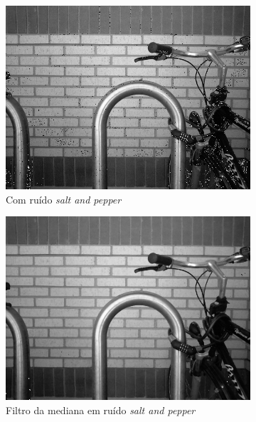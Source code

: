 \documentclass[10pt,a4paper]{article}
\begin{document}
\begin{figure}[!ht]
    \centering
    \begin{subfigure}[ht]{0.45\textwidth}
        \includegraphics[width=\textwidth]{sp.jpg}
        \caption{Com ruído \textit{salt and pepper}}
    \end{subfigure}
    \qquad
    \begin{subfigure}[ht]{0.45\textwidth}
        \includegraphics[width=\textwidth]{sp_median.jpg}
        \caption{Filtro da mediana em ruído \textit{salt and pepper}}
    \end{subfigure}
    \\
    \begin{subfigure}[ht]{0.45\textwidth}

\end{subfigure}
\end{figure}
\end{document}
